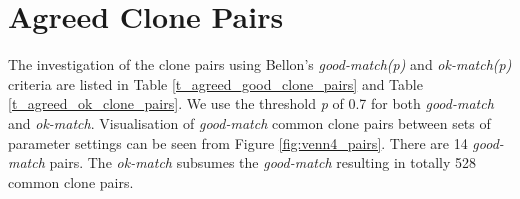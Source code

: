 \documentclass{IEEEtran}
\begin{document}



\section*{Agreed Clone Pairs}
The investigation of the clone pairs using Bellon's \textit{good-match(p)} and \textit{ok-match(p)} criteria are listed in  Table \ref{t_agreed_good_clone_pairs} and Table \ref{t_agreed_ok_clone_pairs}. We use the threshold \textit{p} of 0.7 for both \textit{good-match} and \textit{ok-match}. Visualisation of \textit{good-match} common clone pairs between sets of parameter settings can be seen from Figure \ref{fig:venn4_pairs}. There are 14 \textit{good-match} pairs. The \textit{ok-match} subsumes the \textit{good-match} resulting in totally 528 common clone pairs.
\end{document}
